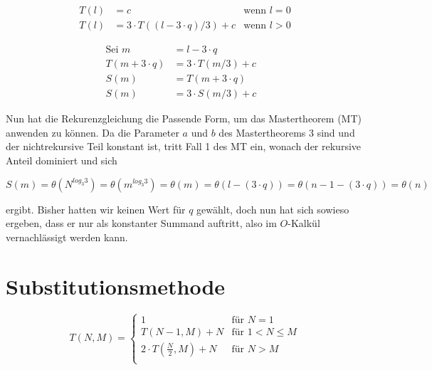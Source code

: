 \documentclass[parskip=half,a4paper]{scrartcl}
\begin{document}
\begin{equation*}
\begin{aligned}
T\left(l\right) & = c & \text{wenn $l = 0$} \\
T\left(l\right) & = 3 \cdot T\left(\left(l - 3 \cdot q\right) / 3\right) + c & \text{wenn $l > 0$}
\end{aligned}
\end{equation*}



\begin{equation*}
\begin{aligned}
\text{Sei $m$} & = l - 3 \cdot q &\\
T\left(m + 3 \cdot q\right) &= 3 \cdot T\left(m / 3\right) + c  \\
S\left(m\right) & = T\left(m + 3 \cdot q\right) \\
S\left(m\right) & = 3 \cdot S\left(m / 3\right) + c
\end{aligned}
\end{equation*}

Nun hat die Rekurenzgleichung die Passende Form, um das Mastertheorem (MT)
anwenden zu können. Da die Parameter $a$ und $b$ des Mastertheorems 3 sind und der
nichtrekursive Teil konstant ist, tritt Fall 1 des MT ein, wonach der rekursive
Anteil dominiert und sich

$$
S\left(m\right) = \theta\left(N^{log_3{3}}\right)= \theta\left(m^{log_3{3}}\right) = \theta\left(m\right) = \theta\left(l - \left(3 \cdot q\right)\right) = \theta\left(n - 1 - \left(3 \cdot q\right)\right) = \theta\left(n\right)
$$

ergibt. Bisher hatten wir keinen Wert für $q$ gewählt, doch nun hat sich sowieso ergeben, dass er nur als konstanter Summand auftritt, also im $O$-Kalkül vernachlässigt werden kann.


\section*{Substitutionsmethode}

\begin{equation*}
    T\left(N, M\right) =
\begin{cases}
    1 & \text{für $N = 1$}\\
    T\left(N-1, M\right) + N & \text{für $1 < N \le M$} \\
    2 \cdot T\left(\frac{N}{2}, M\right) + N & \text{für $N > M$} \\
\end{cases}
\end{equation*}
\end{document}
